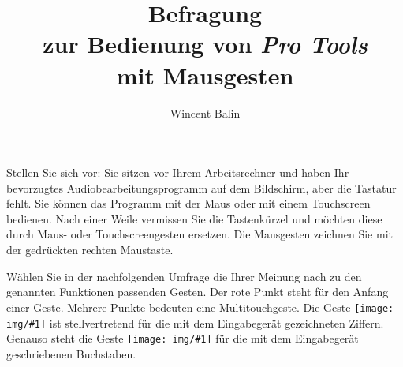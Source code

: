 \documentclass[11pt,a4paper,notitlepage]{article}
\author{Wincent Balin}
\title{Befragung\\zur Bedienung von \emph{Pro Tools}\\mit Mausgesten}
\begin{document}
\maketitle


\newcommand{\quarterpic}[1][]{\texttt{[image: img/\#1]}}

Stellen Sie sich vor: Sie sitzen vor Ihrem Arbeitsrechner und haben Ihr bevorzugtes Audiobearbeitungsprogramm
auf dem Bildschirm, aber die Tastatur fehlt. Sie können das Programm mit der Maus oder mit einem Touchscreen bedienen.
Nach einer Weile vermissen Sie die Tastenkürzel und möchten diese durch Maus- oder Touchscreengesten ersetzen.
Die Mausgesten zeichnen Sie mit der gedrückten rechten Maustaste.

Wählen Sie in der nachfolgenden Umfrage die Ihrer Meinung nach zu den genannten Funktionen passenden Gesten.
Der rote Punkt steht für den Anfang einer Geste. Mehrere Punkte bedeuten eine Multitouchgeste.
Die Geste \quarterpic[digit-1] ist stellvertretend für die mit dem Eingabegerät gezeichneten Ziffern. Genauso steht
die Geste \quarterpic[letter-a] für die mit dem Eingabegerät geschriebenen Buchstaben.

\newcommand{\rownumber}{\addtocounter{rownum}{1}\arabic{rownum}}
\setcounter{rownum}{0}

\tablelasttail{\bottomrule}
\end{document}
